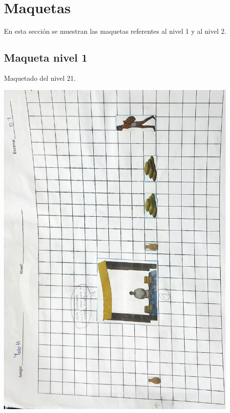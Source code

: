 \section{Maquetas}
En esta sección se muestran las maquetas referentes al nivel 1 y al nivel 2.

\subsection{Maqueta nivel 1}
Maquetado del nivel 21.
\begin{center}
\includegraphics[width=0.9\textwidth]{09Anexos/sprites/M0101.jpg}
\end{center}

